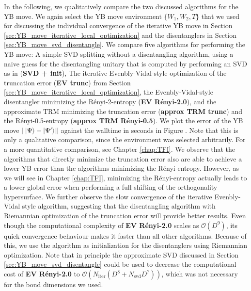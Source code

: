 
In the following, we qualitatively compare the two discussed algorithms for the YB move. We again select the YB move environment $\{W_1,W_2, T\}$ that we used for discussing the individual convergence of the iterative YB move in Section \ref{sec:YB_move_iterative_local_optimization} and the disentanglers in Section \ref{sec:YB_move_svd_disentangle}. We compare five algorithms for performing the YB move: A simple SVD splitting without a disentangling algorithm, using a naive guess for the disentangling unitary that is computed by performing an SVD as in \cite{cite:isometric_tensor_network_states_in_two_dimensions, cite:efficient_simulation_of_dynamics_in_two_dimensional_quantum_spin_systems} (\textbf{SVD + init}), The iterative Evenbly-Vidal-style optimization of the truncation error (\textbf{EV trunc}) from Section \ref{sec:YB_move_iterative_local_optimization}, the Evenbly-Vidal-style disentangler minimizing the Rényi-2-entropy (\textbf{EV Rényi-2.0}), and the approximate TRM minimizing the truncation error (\textbf{approx TRM trunc}) and the Rényi-0.5-entropy (\textbf{approx TRM Rényi-0.5}). We plot the error of the YB move $\lVert\ket{\Psi}-\ket{\Psi^\prime}\rVert$ against the walltime in seconds in Figure . Note that this is only a qualitative comparison, since the environment was selected arbitrarily. For a more quantitative comparison, see Chapter \ref{chap:TFI}. We observe that the algorithms that directly minimize the truncation error also are able to achieve a lower YB error than the algorithms minimizing the Rényi-entropy. However, as we will see in Chapter \ref{chap:TFI}, minimizing the Rényi-entropy actually leads to a lower global error when performing a full shifting of the orthogonality hypersurface. We further observe the slow convergence of the iterative Evenbly-Vidal style algorithm, suggesting that the disentangling algorithm with Riemannian optimization of the truncation error will provide better results. Even though the computational complexity of \textbf{EV Rényi-2.0} scales as $\mathcal{O}(D^9)$, its quick convergence behaviour makes it faster than all other algorithms. Because of this, we use the algorithm as initialization for the disentanglers using Riemannian optimization. Note that in principle the approximate SVD discussed in Section \ref{sec:YB_move_svd_disentangle} could be used to decrease the computational cost of \textbf{EV Rényi-2.0} to $\mathcal{O}(N_\text{iter}(D^8 + N_\text{svd} D^7))$, which was not necessary for the bond dimensions we used.